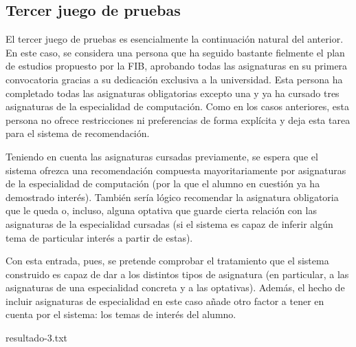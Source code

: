 
\subsection{Tercer juego de pruebas} \label{sec:prueba-3}

El tercer juego de pruebas es esencialmente la continuación natural del 
anterior. En este caso, se considera una persona que ha seguido bastante 
fielmente el plan de estudios propuesto por la FIB, aprobando todas las 
asignaturas en su primera convocatoria gracias a su dedicación exclusiva a la 
universidad. Esta persona ha completado todas las asignaturas obligatorias 
excepto una y ya ha cursado tres asignaturas de la especialidad de 
computación. Como en los casos anteriores, esta persona no ofrece 
restricciones ni preferencias de forma explícita y deja esta tarea para el 
sistema de recomendación.

Teniendo en cuenta las asignaturas cursadas previamente, se espera que el 
sistema ofrezca una recomendación compuesta mayoritariamente por asignaturas 
de la especialidad de computación (por la que el alumno en cuestión ya ha 
demostrado interés). También sería lógico recomendar la asignatura obligatoria 
que le queda o, incluso, alguna optativa que guarde cierta relación con las 
asignaturas de la especialidad cursadas (si el sistema es capaz de inferir 
algún tema de particular interés a partir de estas).

Con esta entrada, pues, se pretende comprobar el tratamiento que el sistema 
construido es capaz de dar a los distintos tipos de asignatura (en particular, 
a las asignaturas de una especialidad concreta y a las optativas). Además, 
el hecho de incluir asignaturas de especialidad en este caso añade otro factor 
a tener en cuenta por el sistema: los temas de interés del alumno.

%
    {resultado-3.txt}

